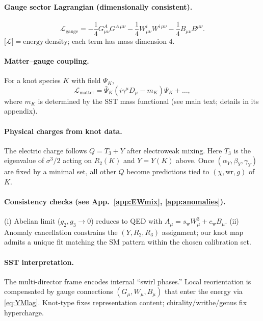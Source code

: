 \documentclass[10pt,reprint,aps,onecolumn,nofootinbib]{revtex4-2}
\begin{document}
\paragraph{Gauge sector Lagrangian (dimensionally consistent).}
    \begin{equation}
    \mathcal{L}_{\text{gauge}}
    = -\frac{1}{4} G_{\mu\nu}^A G^{A\,\mu\nu}
    -\frac{1}{4} W_{\mu\nu}^i W^{i\,\mu\nu}
    -\frac{1}{4} B_{\mu\nu} B^{\mu\nu}.
    \label{eq:YMlag}
    \end{equation}
    $\big[\mathcal{L}\big]=\mathrm{energy~density}$; each term has mass dimension 4.

\paragraph{Matter–gauge coupling.}
    For a knot species $K$ with field $\Psi_K$,
    \begin{equation}
    \mathcal{L}_{\text{matter}} = \bar{\Psi}_K(i\gamma^\mu D_\mu - m_K)\Psi_K + \ldots,
    \label{eq:matter}
    \end{equation}
    where $m_K$ is determined by the SST mass functional (see main text; details in its appendix).

\paragraph{Physical charges from knot data.}
    The electric charge follows $Q = T_3 + Y$ after electroweak mixing.
    Here $T_3$ is the eigenvalue of $\sigma^3/2$ acting on $R_2(K)$ and
    $Y=Y(K)$ above. Once $(\alpha_Y,\beta_Y,\gamma_Y)$ are fixed by a minimal set,
    all other $Q$ become predictions tied to $(\chi,\mathrm{wr},g)$ of $K$.

\paragraph{Consistency checks (see App.~\ref{app:EWmix}, \ref{app:anomalies}).}
(i) Abelian limit ($g_2,g_3\!\to\!0$) reduces to QED with $A_\mu=s_\mathrm{w} W_\mu^3 + c_\mathrm{w} B_\mu$.
    (ii) Anomaly cancellation constrains the $(Y, R_2, R_3)$ assignment; our knot map admits a unique fit matching the SM pattern within the chosen calibration set.

\paragraph{SST interpretation.}
    The multi-director frame encodes internal “swirl phases.” Local reorientation is compensated by gauge connections $(G_\mu,W_\mu,B_\mu)$ that enter the energy via \eqref{eq:YMlag}. Knot-type fixes representation content; chirality/writhe/genus fix hypercharge.
\end{document}
